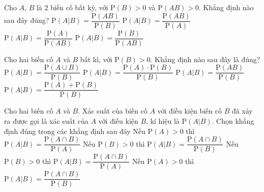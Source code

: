 \begin{ex}%
	Cho $A$, $B$ là $2$ biến cố bất kỳ, với $\mathrm{P}(B)>0$ và  $\mathrm{P}(AB)>0$. Khẳng định nào sau đây đúng?
	\choice 
		 {\True $\mathrm{P}(A|B)=\dfrac{\mathrm{P}(AB)}{\mathrm{P}(B)}$}
		 {$\mathrm{P}(A|B)=\dfrac{\mathrm{P}(AB)}{\mathrm{P}(A)}$}
		{$\mathrm{P}(A|B)=\dfrac{\mathrm{P}(A)}{\mathrm{P}(AB)}$} 
		 {$\mathrm{P}(A|B)=\dfrac{\mathrm{P}(B)}{\mathrm{P}(AB)}$}
\end{ex}

\begin{ex}%
	Cho hai biến  cố $A$ và $B$ bất kì, với $\mathrm{P}(B) > 0$. Khẳng định nào sau đây là đúng?
	\choice 
		{$\mathrm{P}(A|B) = \dfrac{\mathrm{P}(A \cup B)}{\mathrm{P}(B)}$} 
		{$\mathrm{P}(A|B) = \dfrac{\mathrm{P}(A) \cdot \mathrm{P}(B)}{\mathrm{P}(B)}$} 
		{\True $\mathrm{P}(A|B)  = \dfrac{\mathrm{P}(AB)}{\mathrm{P}(B)}$}
		{$\mathrm{P}(A|B) = \dfrac{\mathrm{P}(A) +  \mathrm{P}(B)}{\mathrm{P}(B)}$}
\end{ex}

\begin{ex}%
	Cho hai biến cố $A$ và $B$. Xác suất của biến cố $A$ với điều kiện biến cố $B$ đã xảy  ra được gọi là xác suất của $A$ với điều kiện $B$, kí hiệu là $\mathrm{P}(A|B)$. Chọn khẳng định đúng trong các khẳng định sau đây
	\choice 
		{Nếu $\mathrm{P}(A) > 0$ thì $\mathrm{P}(A|B) =  \dfrac{\mathrm{P}(A \cap B)}{\mathrm{P}(A)}$}
		{\True Nếu $\mathrm{P}(B) > 0$ thì $\mathrm{P}(A|B)  = \dfrac{\mathrm{P}(A \cap B)}{\mathrm{P}(B)}$}
		{Nếu $\mathrm{P}(B) > 0$ thì $\mathrm{P}(A|B) = \dfrac{\mathrm{P}(A \cap B)}{\mathrm{P}(A)}$} 
		{Nếu $\mathrm{P}(A) > 0$ thì $\mathrm{P}(A|B) = \dfrac{\mathrm{P}(A \cap B)}{\mathrm{P}(B)}$} 
\end{ex}

